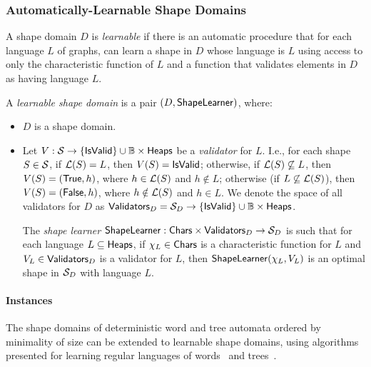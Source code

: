 \subsubsection{Automatically-Learnable Shape Domains}
%
A shape domain $D$ is \emph{learnable} if there is an automatic
procedure that for each language $L$ of graphs, can learn a shape in
$D$ whose language is $L$ using access to only the characteristic
function of $L$ and a function that validates elements in $D$ as
having language $L$.
\begin{defn}
  \label{defn:learnable}
  A \emph{learnable shape domain} is a pair $(D, \mathsf{ShapeLearner})$,
  where:
  \begin{itemize}
  \item
    $D$ is a shape domain.
  \item
    Let $V: \mathcal{S} \to \{ \mathsf{IsValid} \} \cup \mathbb{B} \times
    \mathsf{Heaps}$ be a \emph{validator} for $L$.
    I.e., for each shape $S \in \mathcal{S}$, if $\mathcal{L}(S) = L$,
    then $V(S) = \mathsf{IsValid}$;
    otherwise, if $\mathcal{L}(S) \not\subseteq L$, then
    $V(S) = (\mathsf{True}, h)$, where $h \in \mathcal{L}(S)$ and
    $h \notin L$;
    otherwise (if $L \not\subseteq \mathcal{L}(S)$), then
    $V(S) = (\mathsf{False}, h)$, where $h \notin \mathcal{L}(S)$
    and $h \in L$.
    We denote the space of all validators for $D$ as $\mathsf{Validators}_D =
    \mathcal{S}_D \to \{ \mathsf{IsValid} \} \cup \mathbb{B} \times \mathsf{Heaps}$.

    The \emph{shape learner} $\mathsf{ShapeLearner}: \mathsf{Chars} \times
    \mathsf{Validators}_D \to \mathcal{S}_D$ is such that for each language $L
    \subseteq \mathsf{Heaps}$, if $\chi_L \in \mathsf{Chars}$ is a characteristic
    function for $L$ and $V_L \in \mathsf{Validators}_D$ is a
    validator for $L$, then $\mathsf{ShapeLearner}(\chi_L, V_L)$
    is an optimal shape in $\mathcal{S}_D$ with language $L$.
  \end{itemize}
\end{defn}

\paragraph{Instances}
The shape domains of deterministic word and tree automata ordered by
minimality of size can be extended to learnable shape domains, using
algorithms presented for learning regular languages of
words~\cite{angluin87} and trees~\cite{besombes07}.

